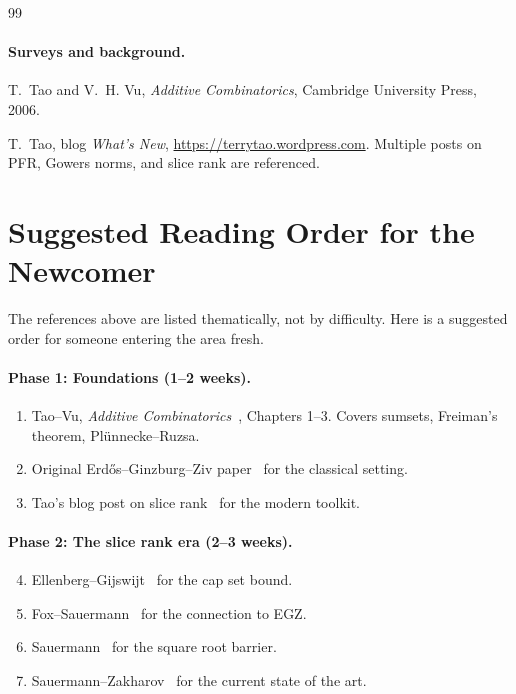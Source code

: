 \documentclass[11pt,a4paper]{article}
\theoremstyle{plain}
\theoremstyle{definition}
\theoremstyle{remark}
\begin{document}
\begin{thebibliography}{99}
\paragraph{Surveys and background.}

T.~Tao and V.~H. Vu, \emph{Additive Combinatorics}, Cambridge University Press, 2006.

T.~Tao, blog \emph{What's New}, \url{https://terrytao.wordpress.com}. Multiple posts on PFR, Gowers norms, and slice rank are referenced.

\end{thebibliography}

\section{Suggested Reading Order for the Newcomer}

The references above are listed thematically, not by difficulty. Here is a suggested order for someone entering the area fresh.

\paragraph{Phase 1: Foundations (1--2 weeks).}
\begin{enumerate}[leftmargin=2em]
  \item Tao--Vu, \emph{Additive Combinatorics}~\cite{taovu2006}, Chapters 1--3. Covers sumsets, Freiman's theorem, Plünnecke--Ruzsa.
  \item Original Erd\H{o}s--Ginzburg--Ziv paper~\cite{egz1961} for the classical setting.
  \item Tao's blog post on slice rank~\cite{tao2016sliceblog} for the modern toolkit.
\end{enumerate}

\paragraph{Phase 2: The slice rank era (2--3 weeks).}
\begin{enumerate}[leftmargin=2em]
\setcounter{enumi}{3}
  \item Ellenberg--Gijswijt~\cite{ellenberggijswijt2017} for the cap set bound.
  \item Fox--Sauermann~\cite{foxsauermann2018} for the connection to EGZ.
  \item Sauermann~\cite{sauermann2021} for the square root barrier.
  \item Sauermann--Zakharov~\cite{sauermannzakharov2023} for the current state of the art.
\end{enumerate}
\end{document}
